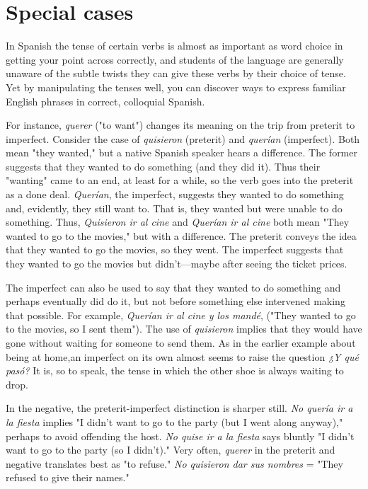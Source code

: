 \documentclass[14pt,a4paper,oneside]{memoir}
\begin{document}
\section{Special cases}

In Spanish the tense of certain verbs is almost as important as
word choice in getting your point across correctly, and students of the
language are generally unaware of the subtle twists they can give these
verbs by their choice of tense. Yet by manipulating the tenses well,
you can discover ways to express familiar English phrases in correct,
colloquial Spanish.

For instance, \emph{querer} ("to want") changes its meaning on the
trip from preterit to imperfect. Consider the case of \emph{quisieron} (preterit)
and \emph{querían} (imperfect). Both mean "they wanted," but a native Spanish speaker hears a difference. The former suggests that they wanted to
do something (and they did it). Thus their "wanting" came to an end,
at least for a while, so the verb goes into the preterit as a done deal.
\emph{Querían}, the imperfect, suggests they wanted to do something and,
evidently, they still want to. That is, they wanted but were unable to
do something. Thus, \emph{Quisieron ir al cine} and \emph{Querían ir al cine} both
mean "They wanted to go to the movies," but with a difference. The
preterit conveys the idea that they wanted to go the movies, so they
went. The imperfect suggests that they wanted to go the movies but
didn't---maybe after seeing the ticket prices.

The imperfect can also be used to say that they wanted to do
something and perhaps eventually did do it, but not before something
else intervened making that possible. For example, \emph{Querían ir al cine
	y los mandé}, ("They wanted to go to the movies, so I sent them"). The
use of \emph{quisieron} implies that they would have gone without waiting
for someone to send them. As in the earlier example about being at
home,an imperfect on its own almost seems to raise the question \emph{¿Y
	qué pasó?} It is, so to speak, the tense in which the other shoe is always
waiting to drop.

In the negative, the preterit-imperfect distinction is sharper
still. \emph{No quería ir a la fiesta} implies "I didn't want to go to the party
(but I went along anyway)," perhaps to avoid offending the host. \emph{No
	quise ir a la fiesta} says bluntly "I didn't want to go to the party (so I
didn't)." Very often, \emph{querer} in the preterit and negative translates best
as "to refuse." \emph{No quisieron dar sus nombres} = "They refused to give
their names."
\end{document}
